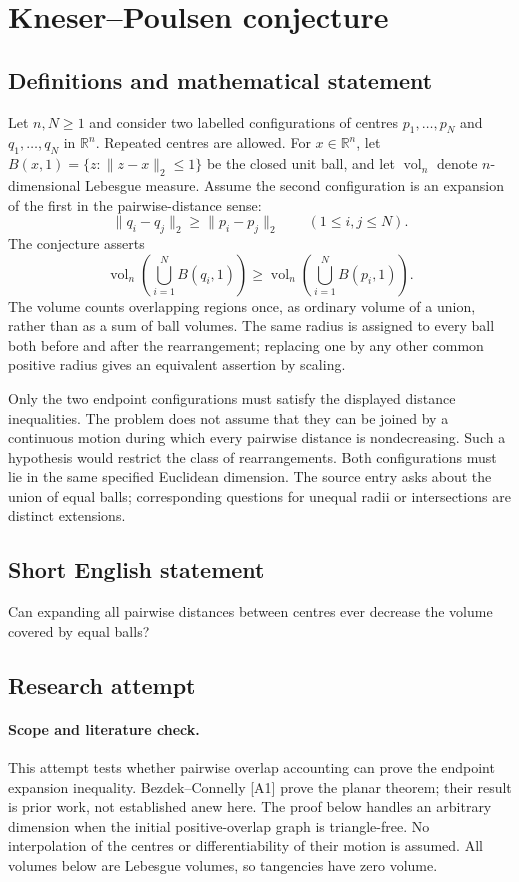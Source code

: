 \documentclass[11pt,a4paper]{article}
\begin{document}
\section*{Kneser–Poulsen conjecture}\label{statement}

\subsection{Definitions and mathematical statement}
Let $n,N\ge1$ and consider two labelled configurations of centres
$p_1,\ldots,p_N$ and $q_1,\ldots,q_N$ in $\mathbb R^n$.
Repeated centres are allowed. For $x\in\mathbb R^n$, let
$B(x,1)=\{z:\|z-x\|_2\le1\}$ be the closed unit ball, and let
$\operatorname{vol}_n$ denote $n$-dimensional Lebesgue measure.
Assume the second configuration is an expansion of the first in the
pairwise-distance sense:
\[
 \|q_i-q_j\|_2\ge\|p_i-p_j\|_2
                    \qquad(1\le i,j\le N).
\]
The conjecture asserts
\[
 \operatorname{vol}_n\!\left(\bigcup_{i=1}^N B(q_i,1)\right)
 \ge
 \operatorname{vol}_n\!\left(\bigcup_{i=1}^N B(p_i,1)\right).
\]
The volume counts overlapping regions once, as ordinary volume of a
union, rather than as a sum of ball volumes. The same radius is assigned
to every ball both before and after the rearrangement; replacing one by
any other common positive radius gives an equivalent assertion by scaling.

Only the two endpoint configurations must satisfy the displayed distance
inequalities. The problem does not assume that they can be joined by a
continuous motion during which every pairwise distance is nondecreasing.
Such a hypothesis would restrict the class of rearrangements. Both
configurations must lie in the same specified Euclidean dimension.
The source entry asks about the union of equal balls; corresponding
questions for unequal radii or intersections are distinct extensions.
\subsection{Short English statement}
Can expanding all pairwise distances between centres ever decrease the volume covered by equal balls?
\subsection{Research attempt}
\paragraph{Scope and literature check.}
This attempt tests whether pairwise overlap accounting can prove the endpoint
expansion inequality. Bezdek--Connelly [A1] prove the planar theorem; their
result is prior work, not established anew here. The proof below handles an
arbitrary dimension when the initial positive-overlap graph is triangle-free.
No interpolation of the centres or differentiability of their motion is assumed.
All volumes below are Lebesgue volumes, so tangencies have zero volume.
\end{document}
